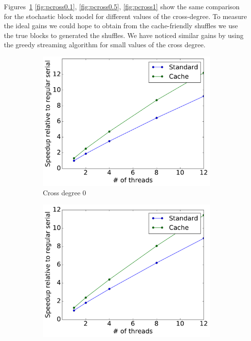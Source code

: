\documentclass[times,11pt]{article}
\numberwithin{equation}{section}		%
\numberwithin{figure}{section}			%
\numberwithin{table}{section}				%
\begin{document}
Figures~\ref{fig:pcross0} \ref{fig:pcross0.1}, \ref{fig:pcross0.5}, \ref{fig:pcross1} show the same comparison for the stochastic block model for different values of the cross-degree. To measure the ideal gains we could hope to obtain from the 
cache-friendly shuffles we use the true blocks to generated the shuffles. We have noticed similar gains by using the greedy streaming algorithm for small values of the cross degree. 

\begin{figure}[h!]
\centering
    \begin{subfigure}[b]{0.49\columnwidth}
	\centerline{\includegraphics[width = 0.85\columnwidth, trim={0 0.1cm  0 0}, clip]{report_LS_speedup_blockmodel_pcross=0.pdf}}
      \caption{\scriptsize Cross degree 0}
      \label{fig:pcross0}
    \end{subfigure}
   \begin{subfigure}[b]{0.49\columnwidth}
      	\centerline{\includegraphics[width = 0.85\columnwidth, trim={0 0.1cm  0 0}, clip]{report_LS_speedup_blockmodel_pcross=01.pdf}}

\end{subfigure}
\end{figure}
\end{document}
